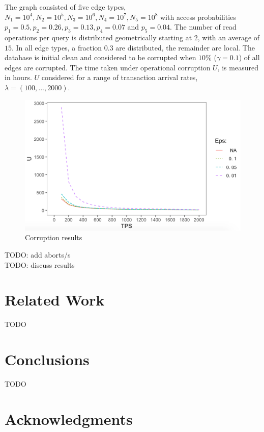 \documentclass[sigplan,10pt]{acmart}
\begin{document}
The graph consisted of five edge types, $N_1=10^4, N_2=10^5, N_3=10^6, N_4=10^7, N_5=10^8$ with access probabilities $p_1 =0.5, p_2 =0.26, p_3=0.13, p_4=0.07$ and $p_5 =0.04$. The number of read operations per query is distributed geometrically starting at $2$, with an average of $15$. In all edge types, a fraction $0.3$ are distributed, the remainder are local. The database is initial clean and considered to be corrupted when $10$\% ($\gamma = 0.1$) of all edges are corrupted. The time taken under operational corruption $U$, is measured in hours. $U$ considered for a range of transaction arrival rates, $\lambda = (100, ..., 2000)$.

\begin{figure}[h]
  \centering
  \includegraphics[width=\linewidth]{./images/results}
  \caption{Corruption results}
  \label{results}
\end{figure}

TODO: add aborts/s \\
TODO: discuss results

\section{Related Work}

TODO

\section{Conclusions}

TODO

\section{Acknowledgments}
\end{document}
